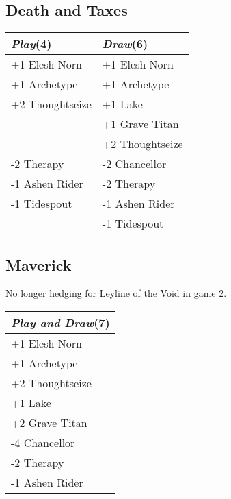 \documentclass{article}
\renewcommand *\contentsname{Contents}
\begin{document}
\begin{multicols}{2}
\subsection*{Death and Taxes}
\begin{center}
\begin{tabular}{| l | l |}
\hline
\textit{Play}(4) & \textit{Draw}(6) \\
\hline
\cellcolor[HTML]{BBDDBB}\small{+1 Elesh Norn} & \cellcolor[HTML]{BBDDBB}\small{+1 Elesh Norn}\\
\cellcolor[HTML]{BBDDBB}\small{+1 Archetype} & \cellcolor[HTML]{BBDDBB}\small{+1 Archetype}\\
\cellcolor[HTML]{BBDDBB}\small{+2 Thoughtseize} & \cellcolor[HTML]{BBDDBB}\small{+1 Lake}\\
 & \cellcolor[HTML]{BBDDBB}\small{+1 Grave Titan}\\
 & \cellcolor[HTML]{BBDDBB}\small{+2 Thoughtseize}\\
\cellcolor[HTML]{DDBBBB}\small{-2 Therapy} & \cellcolor[HTML]{DDBBBB}\small{-2 Chancellor}\\
\cellcolor[HTML]{DDBBBB}\small{-1 Ashen Rider} & \cellcolor[HTML]{DDBBBB}\small{-2 Therapy}\\
\cellcolor[HTML]{DDBBBB}\small{-1 Tidespout} & \cellcolor[HTML]{DDBBBB}\small{-1 Ashen Rider}\\
 & \cellcolor[HTML]{DDBBBB}\small{-1 Tidespout}\\
\hline
\end{tabular}
\end{center}
\subsection*{Maverick}
No longer hedging for Leyline of the Void in game 2.\begin{center}
\begin{tabular}{| l |}
\hline
\textit{Play and Draw}(7) \\
\hline
\cellcolor[HTML]{BBDDBB}\small{+1 Elesh Norn}\\
\cellcolor[HTML]{BBDDBB}\small{+1 Archetype}\\
\cellcolor[HTML]{BBDDBB}\small{+2 Thoughtseize}\\
\cellcolor[HTML]{BBDDBB}\small{+1 Lake}\\
\cellcolor[HTML]{BBDDBB}\small{+2 Grave Titan}\\
\cellcolor[HTML]{DDBBBB}\small{-4 Chancellor}\\
\cellcolor[HTML]{DDBBBB}\small{-2 Therapy}\\
\cellcolor[HTML]{DDBBBB}\small{-1 Ashen Rider}\\
\hline
\end{tabular}
\end{center}

\end{multicols}
\end{document}
